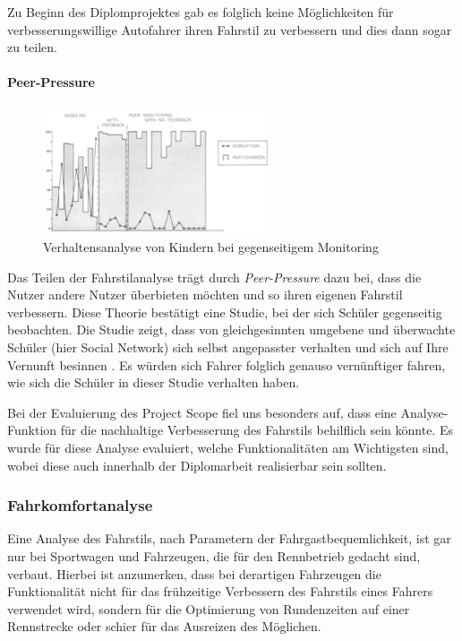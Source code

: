 Zu Beginn des Diplomprojektes gab es folglich keine Möglichkeiten für verbesserungswillige Autofahrer ihren Fahrstil zu verbessern und dies dann sogar zu teilen. 
\newpage
\paragraph{Peer-Pressure} 
\begin{figure}\centering
    \includegraphics[width=0.6\textwidth]{images/peerPressure}
    \caption{Verhaltensanalyse von Kindern bei gegenseitigem Monitoring \cite{SIMR.CH1-fahrstil-analyse.PeerPressure}} \label{Fig:imgPeerPressure}
\end{figure}
Das Teilen der Fahrstilanalyse trägt durch \textit{Peer-Pressure}  dazu bei, dass die Nutzer andere Nutzer überbieten möchten und so ihren eigenen Fahrstil verbessern. Diese Theorie bestätigt eine Studie, bei der sich Schüler gegenseitig beobachten. Die Studie zeigt, dass von gleichgesinnten umgebene und überwachte Schüler (hier Social Network) sich selbst angepasster verhalten und sich auf Ihre Vernunft besinnen \cite{SIMR.CH1-fahrstil-analyse.PeerPressure}. Es würden sich Fahrer folglich genauso vernünftiger fahren, wie sich die Schüler in dieser Studie verhalten haben.

Bei der Evaluierung des Project Scope fiel uns besonders auf, dass eine Analyse-Funktion für die nachhaltige Verbesserung des Fahrstils behilflich sein könnte. Es wurde für diese Analyse evaluiert, welche Funktionalitäten am Wichtigsten sind, wobei diese auch innerhalb der Diplomarbeit realisierbar sein sollten.

\subsubsection{Fahrkomfortanalyse}
Eine Analyse des Fahrstils, nach Parametern der Fahrgastbequemlichkeit, ist gar nur bei Sportwagen und Fahrzeugen, die für den Rennbetrieb gedacht sind, verbaut. Hierbei ist anzumerken, dass bei derartigen Fahrzeugen die Funktionalität nicht für das frühzeitige Verbessern des Fahrstils eines Fahrers verwendet wird, sondern für die Optimierung von Rundenzeiten auf einer Rennstrecke oder schier für das Ausreizen des Möglichen.

